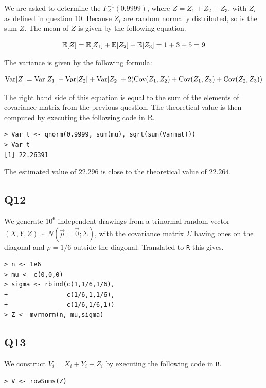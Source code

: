 We are asked to determine the $F^{-1}_{Z}(0.9999)$, where $Z = Z_1 + Z_2 + Z_3$, with $Z_i$ as defined in question 10. Because $Z_i$ are random normally distributed, so is the sum $Z$. The mean of $Z$ is given by the following equation.

\begin{equation}
\operatorname{\mathbb{E}}[Z] = \operatorname{\mathbb{E}}[Z_1] + \operatorname{\mathbb{E}}[Z_2] + \operatorname{\mathbb{E}}[Z_3] = 1 + 3 + 5 = 9
\end{equation}

The variance is given by the following formula:

\begin{equation}
\operatorname{\text{Var}}[Z] = \operatorname{\text{Var}}[Z_1] + \operatorname{\text{Var}}[Z_2] + \operatorname{\text{Var}}[Z_2] + 2 (\operatorname{\text{Cov}}(Z_1,Z_2) + \operatorname{\text{Cov}}(Z_1,Z_3) + \operatorname{\text{Cov}}(Z_2,Z_3))
\end{equation}

The right hand side of this equation is equal to the sum of the elements of covariance matrix from the previous question. The theoretical value is then computed by executing the following code in R.

\begin{verbatim}
> Var_t <- qnorm(0.9999, sum(mu), sqrt(sum(Varmat)))
> Var_t
[1] 22.26391
\end{verbatim}

The estimated value of $22.296$ is close to the theoretical value of $22.264$.

\subsection*{Q12}

We generate $10^6$ independent drawings from a trinormal random vector $(X,Y,Z) \sim N(\vec{\mu} = \vec{0}; \Sigma)$, with the covariance matrix $\Sigma$ having ones on the diagonal and $\rho = 1/6$ outside the diagonal. Translated to \verb|R| this gives.

\begin{verbatim}
> n <- 1e6
> mu <- c(0,0,0)
> sigma <- rbind(c(1,1/6,1/6),
+                c(1/6,1,1/6),
+                c(1/6,1/6,1))
> Z <- mvrnorm(n, mu,sigma)
\end{verbatim}

\subsection*{Q13}

We construct $V_i = X_i + Y_i + Z_i$ by executing the following code in \verb|R|.

\begin{verbatim}
> V <- rowSums(Z)
\end{verbatim}

